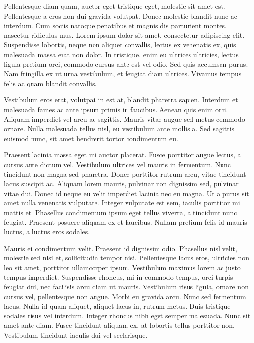 Pellentesque diam quam, auctor eget tristique eget, molestie sit amet est. Pellentesque a eros non dui gravida volutpat. Donec molestie blandit nunc ac interdum. Cum sociis natoque penatibus et magnis dis parturient montes, nascetur ridiculus mus. Lorem ipsum dolor sit amet, consectetur adipiscing elit. Suspendisse lobortis, neque non aliquet convallis, lectus ex venenatis ex, quis malesuada massa erat non dolor. In tristique, enim eu ultrices ultricies, lectus ligula pretium orci, commodo cursus ante est vel odio. Sed quis accumsan purus. Nam fringilla ex ut urna vestibulum, et feugiat diam ultrices. Vivamus tempus felis ac quam blandit convallis.

Vestibulum eros erat, volutpat in est at, blandit pharetra sapien. Interdum et malesuada fames ac ante ipsum primis in faucibus. Aenean quis enim orci. Aliquam imperdiet vel arcu ac sagittis. Mauris vitae augue sed metus commodo ornare. Nulla malesuada tellus nisl, eu vestibulum ante mollis a. Sed sagittis euismod nunc, sit amet hendrerit tortor condimentum eu.

Praesent lacinia massa eget mi auctor placerat. Fusce porttitor augue lectus, a cursus ante dictum vel. Vestibulum ultrices vel mauris in fermentum. Nunc tincidunt non magna sed pharetra. Donec porttitor rutrum arcu, vitae tincidunt lacus suscipit ac. Aliquam lorem mauris, pulvinar non dignissim sed, pulvinar vitae dui. Donec id neque eu velit imperdiet lacinia nec eu magna. Ut a purus sit amet nulla venenatis vulputate. Integer vulputate est sem, iaculis porttitor mi mattis et. Phasellus condimentum ipsum eget tellus viverra, a tincidunt nunc feugiat. Praesent posuere aliquam ex et faucibus. Nullam pretium felis id mauris luctus, a luctus eros sodales.

Mauris et condimentum velit. Praesent id dignissim odio. Phasellus nisl velit, molestie sed nisi et, sollicitudin tempor nisi. Pellentesque lacus eros, ultricies non leo sit amet, porttitor ullamcorper ipsum. Vestibulum maximus lorem ac justo tempus imperdiet. Suspendisse rhoncus, mi in commodo tempus, orci turpis feugiat dui, nec facilisis arcu diam ut mauris. Vestibulum risus ligula, ornare non cursus vel, pellentesque non augue. Morbi eu gravida arcu. Nunc sed fermentum lacus. Nulla id quam aliquet, aliquet lacus in, rutrum metus. Duis tristique sodales risus vel interdum. Integer rhoncus nibh eget semper malesuada. Nunc sit amet ante diam. Fusce tincidunt aliquam ex, at lobortis tellus porttitor non. Vestibulum tincidunt iaculis dui vel scelerisque.

